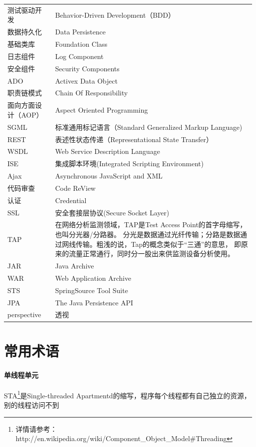\documentclass{book}
\begin{document}
\begin{longtable}{lp{10cm}}
	测试驱动开发 & Behavior-Driven Development（BDD）\\
	数据持久化 & Data Persistence\\
	基础类库 & Foundation Class\\
	日志组件 & Log Component\\
	安全组件 & Security Components\\
	ADO & Activex Data Object\\
	职责链模式 & Chain Of Responsibility\\
	面向方面设计（AOP） & Aspect Oriented Programming\\
	SGML & 标准通用标记语言（Standard Generalized Markup Language)\\
	REST & 表述性状态传递（Representational State Transfer）\\
	WSDL & Web Service Description Language \\
	ISE & 集成脚本环境(Integrated Scripting Environment)\\
	Ajax & Asynchronous JavaScript and XML\\
	代码审查 & Code ReView\\
	认证 & Credential\\
	SSL & 安全套接层协议(Secure Socket Layer)\\
	TAP & 在网络分析监测领域，TAP是Test Access Point的首字母缩写，也叫分光器/分路器。
	分光是数据通过光纤传输；分路是数据通过网线传输。粗浅的说，Tap的概念类似于“三通”的意思，
	即原来的流量正常通行，同时分一股出来供监测设备分析使用。\\
	JAR & Java Archive\\
	WAR & Web Application Archive\\
	STS & SpringSource Tool Suite\\
	JPA & The Java Persistence API\\
	perspective & 透视\\
\end{longtable}

\section{常用术语}

\paragraph{单线程单元}  STA\footnote{详情请参考：http://en.wikipedia.org/wiki/Component\_Object\_Model\#Threading}是Single-threaded Apartmentd的缩写，程序每个线程都有自己独立的资源，别的线程访问不到   
\end{document}
